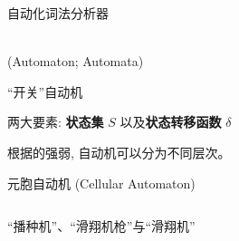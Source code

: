 
\begin{frame}{}
  \begin{center}
    自动化词法分析器
  \end{center}
\end{frame}

\begin{frame}{}
  \begin{center}
     \\[5pt]
    (Automaton; Automata)

    \vspace{-0.30cm}
    ``开关''自动机

    \vspace{0.80cm}
    两大要素: {\bf 状态集} $S$ 以及{\bf 状态转移函数} $\delta$
  \end{center}
\end{frame}

\begin{frame}{}
  \begin{center}

    \vspace{0.50cm}
    根据的强弱, 自动机可以分为不同层次。
  \end{center}
\end{frame}

\begin{frame}{}
  \begin{center}
    元胞自动机 (Cellular Automaton)
  \end{center}

  \vspace{0.30cm}
  \begin{columns}
      \begin{center}
        ``播种机''、``滑翔机枪''与``滑翔机'' \\[5pt]
      \end{center}
      \begin{center}
         \\[3pt]
      \end{center}
  \end{columns}

  \begin{center}
  \end{center}
\end{frame}

